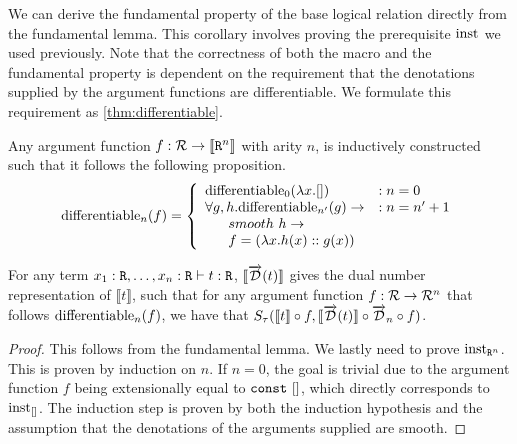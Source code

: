   We can derive the fundamental property of the base logical relation directly from the fundamental lemma.
  This corollary involves proving the prerequisite $\text{inst}_{}$ we used previously.
  Note that the correctness of both the macro and the fundamental property is dependent on the requirement that the denotations supplied by the argument functions are differentiable.
  We formulate this requirement as \cref{thm:differentiable}.

  \begin{definition}\label{thm:differentiable}
    Any argument function $f : \mathcal{R} \rightarrow \llbracket \texttt{R}^n \rrbracket$ with arity $n$, is inductively constructed such that it follows the following proposition.
    \begin{equation}
      \text{differentiable}_{n}(f) =
        \left\{
          \begin{array}{ll}
            \text{differentiable}_{0}(\lambda x. [])
              & : n = 0 \\
            \forall g, h.
              \text{differentiable}_{n'}(g) \rightarrow
              & : n = n' + 1 \\
              \;\;\;\;\;\;smooth\ h \rightarrow \\
              \;\;\;\;\;\;f = (\lambda x. h(x) :: g(x))
          \end{array}
        \right.
    \label{eqn:differentiable_base}
    \end{equation}
  \end{definition}

  \begin{corollary}\label{thm:fundamental_property}
    For any term $x_1 : \texttt{R}, \dots, x_n : \texttt{R} \vdash t : \texttt{R}$, $\llbracket\overrightarrow{\mathcal{D}}(t)\rrbracket$ gives the dual number representation of $\llbracket t \rrbracket$, such that for any argument function $f : \mathcal{R} \to \mathcal{R}^n$ that follows $\text{differentiable}_{n}(f)$, we have that $S_\tau(\llbracket t\rrbracket \circ f, \llbracket \overrightarrow{\mathcal{D}}(t)\rrbracket \circ \overrightarrow{\mathcal{D}}_n \circ f)$.
  \end{corollary}

  \begin{proof}
    This follows from the fundamental lemma. We lastly need to prove $\text{inst}_{\texttt{R}^n}$.
    This is proven by induction on $n$.
    If $n = 0$, the goal is trivial due to the argument function $f$ being extensionally equal to $\texttt{const}\ []$, which directly corresponds to $\text{inst}_{[]}$.
    The induction step is proven by both the induction hypothesis and the assumption that the denotations of the arguments supplied are smooth.
  \end{proof}

